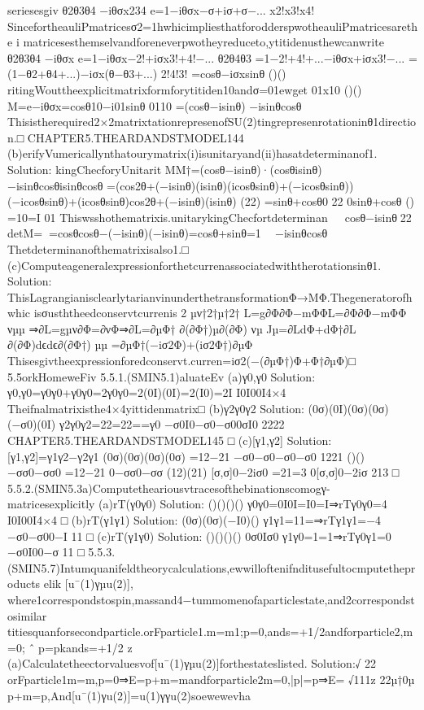 {{{{{{{{{{seriesesgiv
θ2θ3θ4
−iθσx234
e=1−iθσx−σ+iσ+σ−...
x2!x3!x4!
SincefortheauliPmatricesσ2=1hwhicimpliesthatforodderspwotheauliPmatricesarethe
i
matricesesthemselvandforeneverpwotheyreduceto,ytitidenusthewcanwrite
θ2θ3θ4
−iθσx
e=1−iθσx−2!+iσx3!+4!−...
θ2θ4θ3
=1−2!+4!+...−iθσx+iσx3!−...
=(1−θ2+θ4+...)−iσx(θ−θ3+...)
2!4!3!
=cosθ−iσxsinθ
()()
ritingWouttheexplicitmatrixformforytitiden10andσ=01ewget
01x10
()()
M=e−iθσx=cosθ10−i01sinθ
0110
=(cosθ−isinθ)
−isinθcosθ
Thisistherequired2×2matrixtationrepresenofSU(2)tingrepresenrotationinθ1direction.□
CHAPTER5.THEARDANDSTMODEL144
(b)erifyVumericallynthatourymatrix(i)isunitaryand(ii)hasatdeterminanof1.
Solution:
kingChecforyUnitarit
MM†=(cosθ−isinθ)·(cosθisinθ)
−isinθcosθisinθcosθ
=(cos2θ+(−isinθ)(isinθ)(icosθsinθ)+(−icosθsinθ))
(−icosθsinθ)+(icosθsinθ)cos2θ+(−isinθ)(isinθ)
(22)
=sinθ+cosθ0
22
0sinθ+cosθ
()
=10=I
01
Thiswsshothematrixis.unitarykingChecfortdeterminan

cosθ−isinθ22
det{M}==cosθcosθ−(−isinθ)(−isinθ)=cosθ+sinθ=1

−isinθcosθ
Thetdeterminanofthematrixisalso1.□
(c)Computeageneralexpressionforthetcurrenassociatedwiththerotationsinθ1.
Solution:
ThisLagrangianisclearlytarianvinunderthetransformationΦ→MΦ.Thegeneratorofhwhic
isσusththeedconservtcurrenis
2
µν†2†µ†2†
L=g∂Φ∂Φ−mΦΦL=∂Φ∂Φ−mΦΦ
νµµ
⇒∂L=gµν∂Φ=∂νΦ⇒∂L=∂µΦ†
∂(∂Φ†)µ∂(∂Φ)
νµ
Jµ=∂LdΦ+dΦ†∂L
∂(∂Φ)dϵdϵ∂(∂Φ†)
µµ
=∂µΦ†(−iσ2Φ)+(iσ2Φ†)∂µΦ
Thisesgivtheexpressionforedconservt.curren=iσ2(−(∂µΦ†)Φ+Φ†∂µΦ)□
5.5orkHomeweFiv
5.5.1.(SMIN5.1)aluateEv
(a){γ0,γ0}
Solution:
{γ0,γ0}=γ0γ0+γ0γ0=2γ0γ0=2(0I)(0I)=2(I0)=2I
I0I00I4×4
Theifnalmatrixisthe4×4yittidenmatrix□
(b)γ2γ0γ2
Solution:
(0σ)(0I)(0σ)(0σ)(−σ0)(0I)
γ2γ0γ2=22=22==γ0
−σ0I0−σ0−σ00σI0
2222
CHAPTER5.THEARDANDSTMODEL145
□
(c)[γ1,γ2]
Solution:
[γ1,γ2]=γ1γ2−γ2γ1
(0σ)(0σ)(0σ)(0σ)
=12−21
−σ0−σ0−σ0−σ0
1221
()()
−σσ0−σσ0
=12−21
0−σσ0−σσ
(12)(21)
[σ,σ]0−2iσ0
=21=3
0[σ,σ]0−2iσ
213
□
5.5.2.(SMIN5.3a)Computetheariousvtracesofthebinationscomogγ-matricesexplicitly
(a)rT(γ0γ0)
Solution:
()()()()
γ0γ0=0I0I=I0=I⇒rTγ0γ0=4
I0I00I4×4
□
(b)rT(γ1γ1)
Solution:
(0σ)(0σ)(−I0)()
γ1γ1=11=⇒rTγ1γ1=−4
−σ0−σ00−I
11
□
(c)rT(γ1γ0)
Solution:
()()()()
0σ0Iσ0
γ1γ0=1=1⇒rTγ0γ1=0
−σ0I00−σ
11
□
5.5.3.(SMIN5.7)Intumquanifeldtheorycalculations,ewwilloftenifnditusefultocmputetheproducts
elik
[u¯(1)γµu(2)],
where1correspondstospin,massand4−tummomenofaparticlestate,and2correspondstosimilar
titiesquanforsecondparticle.orFparticle1.m=m1;p=0,ands=+1/2andforparticle2,m=0;
ˆ
p=pkands=+1/2
z
(a)Calculatetheectorvaluesvof[u¯(1)γµu(2)]forthestateslisted.
Solution:√
22
orFparticle1m=m,p=0⇒E=p+m=mandforparticle2m=0,|p|=p⇒E=
√111z
22µ†0µ
p+m=p,And[u¯(1)γu(2)]=u(1)γγu(2)soewewevha
}}}}}}}}}}

